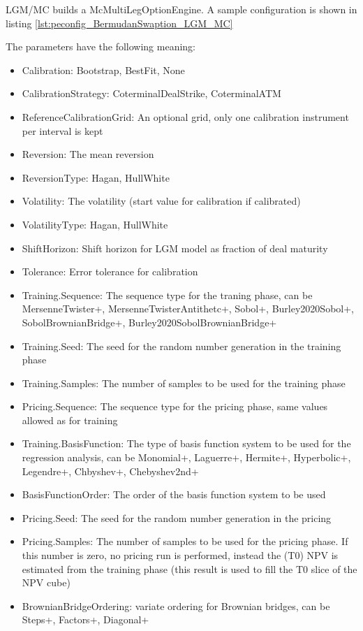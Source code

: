 LGM/MC builds a McMultiLegOptionEngine. A sample configuration is shown in
listing \ref{lst:peconfig_BermudanSwaption_LGM_MC}

The parameters have the following meaning:

\begin{itemize}
\item Calibration: Bootstrap, BestFit, None
\item CalibrationStrategy: CoterminalDealStrike, CoterminalATM
\item ReferenceCalibrationGrid: An optional grid, only one calibration instrument per interval is kept
\item Reversion: The mean reversion
\item ReversionType: Hagan, HullWhite
\item Volatility: The volatility (start value for calibration if calibrated)
\item VolatilityType: Hagan, HullWhite
\item ShiftHorizon: Shift horizon for LGM model as fraction of deal maturity
\item Tolerance: Error tolerance for calibration
\item Training.Sequence: The sequence type for the traning phase, can be MersenneTwister+, MersenneTwisterAntithetc+,
  Sobol+, Burley2020Sobol+, SobolBrownianBridge+, Burley2020SobolBrownianBridge+
\item Training.Seed: The seed for the random number generation in the training phase
\item Training.Samples: The number of samples to be used for the training phase
\item Pricing.Sequence: The sequence type for the pricing phase, same values allowed as for training
\item Training.BasisFunction: The type of basis function system to be used for the regression analysis, can be
  Monomial+, Laguerre+, Hermite+, Hyperbolic+, Legendre+, Chbyshev+, Chebyshev2nd+
\item BasisFunctionOrder: The order of the basis function system to be used
\item Pricing.Seed: The seed for the random number generation in the pricing
\item Pricing.Samples: The number of samples to be used for the pricing phase. If this number is zero, no pricing run is
  performed, instead the (T0) NPV is estimated from the training phase (this result is used to fill the T0 slice of the
  NPV cube)
\item BrownianBridgeOrdering: variate ordering for Brownian bridges, can be Steps+, Factors+, Diagonal+

\end{itemize}
